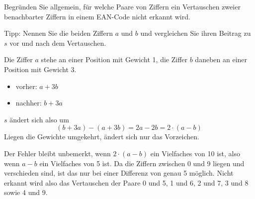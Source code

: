\begin{mychallenge}\label{chl:ean-vertauschen}
    Begründen Sie allgemein, für welche Paare von Ziffern ein Vertauschen zweier benachbarter Ziffern in einem \gls{EAN}-Code nicht erkannt wird.

    Tipp: Nennen Sie die beiden Ziffern $a$ und $b$ und vergleichen Sie ihren Beitrag zu $s$ vor und nach dem Vertauschen.
    \begin{myanswer}
        Die Ziffer $a$ stehe an einer Position mit Gewicht 1, die Ziffer $b$ daneben an einer Position mit Gewicht 3.
        \begin{itemize}
            \item vorher: $a + 3b$
            \item nachher: $b + 3a$
        \end{itemize}
        $s$ ändert sich also um
        \[
            (b + 3a) - (a + 3b) = 2a - 2b = 2 \cdot (a - b)
        \]
        Liegen die Gewichte umgekehrt, ändert sich nur das Vorzeichen.

        Der Fehler bleibt unbemerkt, wenn $2 \cdot (a - b)$ ein Vielfaches von 10 ist, also wenn $a - b$ ein Vielfaches von 5 ist. Da die Ziffern zwischen 0 und 9 liegen und verschieden sind, ist das nur bei einer Differenz von genau 5 möglich. Nicht erkannt wird also das Vertauschen der Paare 0 und 5, 1 und 6, 2 und 7, 3 und 8 sowie 4 und 9.
    \end{myanswer}
\end{mychallenge}

